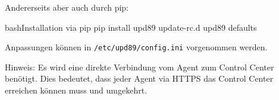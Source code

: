Andererseits aber auch durch pip:

\begin{srclst}[label=lst:agent:installation_by_pip]{bash}{Installation via pip}
pip install upd89
update-rc.d upd89 defaults
\end{srclst}

Anpassungen können in \texttt{/etc/upd89/config.ini} vorgenommen werden.

Hinweis: Es wird eine direkte Verbindung vom Agent zum Control Center benötigt. Dies bedeutet, dass jeder Agent via HTTPS das Control Center erreichen können muss und umgekehrt.